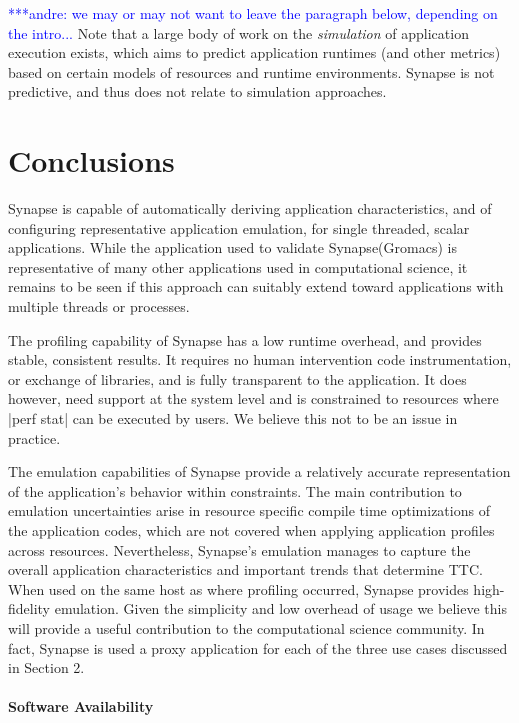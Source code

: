 \documentclass[10pt, conference, compsocconf]{IEEEtran}
\newcommand{\I}[1]{\textit{#1}\xspace}
\newcommand{\amnote}[1]{   {\textcolor{blue}  { ***andre:    #1 }}}
\newcommand{\amnote}[1]{}
\newcommand{\synapse}{Synapse\xspace}
\newcommand{\Synapse}{Synapse\xspace}
\begin{document}
\amnote{we may or may not want to leave the paragraph below, depending on the
  intro...}  Note that a large body of work on the \I{simulation} of application
execution exists, which aims to predict application runtimes (and other metrics)
based on certain models of resources and runtime environments.  \Synapse is not
predictive, and thus does not relate to simulation approaches.


\section{Conclusions}
\label{sec:conclusions}

\synapse is capable of automatically deriving application characteristics, and
of configuring representative application emulation, for single threaded, scalar
applications.  While the application used to validate \synapse (Gromacs) is
representative of many other applications used in computational science, it
remains to be seen if this approach can suitably extend toward applications with
multiple threads or processes.


The profiling capability of \synapse has a low runtime overhead, and provides
stable, consistent results.  It requires no human intervention code
instrumentation, or exchange of libraries, and is fully transparent to the
application. It does however, need support at the system level and is
constrained to resources where |perf stat| can be executed by users. We believe
this not to be an issue in practice.

The emulation capabilities of \synapse provide a relatively accurate
representation of the application's behavior within constraints.  The main
contribution to emulation uncertainties arise in resource specific compile time
optimizations of the application codes, which are not covered when applying
application profiles across resources.  Nevertheless, \synapse's emulation
manages to capture the overall application characteristics and important trends
that determine TTC. When used on the same host as where profiling occurred,
\synapse provides high-fidelity emulation. Given the simplicity and low overhead
of usage we believe this will provide a useful contribution to the computational
science community. In fact, \synapse is used a proxy application for each of the
three use cases discussed in Section 2.




 \paragraph*{Software Availability}\label{sec:software}
 
\end{document}
